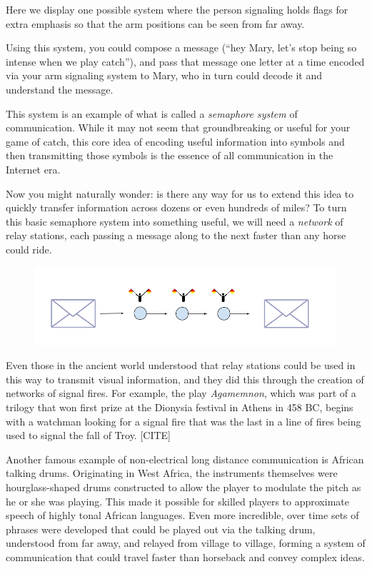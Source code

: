 \documentclass[UTF8]{book}
\begin{document}
\begin{CJK}{UTF8}{gbsn}
Here we display one possible system where the person signaling holds flags for extra emphasis so that the arm positions can be seen from far away.

Using this system, you could compose a message (``hey Mary, let's stop being so intense when we play catch''), and pass that message one letter at a time encoded via your arm signaling system to Mary, who in turn could decode it and understand the message.

This system is an example of what is called a \emph{semaphore system} of communication. While it may not seem that groundbreaking or useful for your game of catch, this core idea of encoding useful information into symbols and then transmitting those symbols is the essence of all communication in the Internet era.

Now you might naturally wonder: is there any way for us to extend this idea to quickly transfer information across dozens or even hundreds of miles? To turn this basic semaphore system into something useful, we will need a \emph{network} of relay stations, each passing a message along to the next faster than any horse could ride.

\begin{figure}[H]
\centering
\includegraphics[width=0.9\linewidth]{relay_stations}
\end{figure}

Even those in the ancient world understood that relay stations could be used in this way to transmit visual information, and they did this through the creation of networks of signal fires. For example, the play \emph{Agamemnon}, which was part of a trilogy that won first prize at the Dionysia festival in Athens in 458 BC, begins with a watchman looking for a signal fire that was the last in a line of fires being used to signal the fall of Troy. [CITE]

Another famous example of non-electrical long distance communication is African talking drums. Originating in West Africa, the instruments themselves were hourglass-shaped drums constructed to allow the player to modulate the pitch as he or she was playing. This made it possible for skilled players to approximate speech of highly tonal African languages. Even more incredible, over time sets of phrases were developed that could be played out via the talking drum, understood from far away, and relayed from village to village, forming a system of communication that could travel faster than horseback and convey complex ideas.


\end{CJK}
\end{document}

